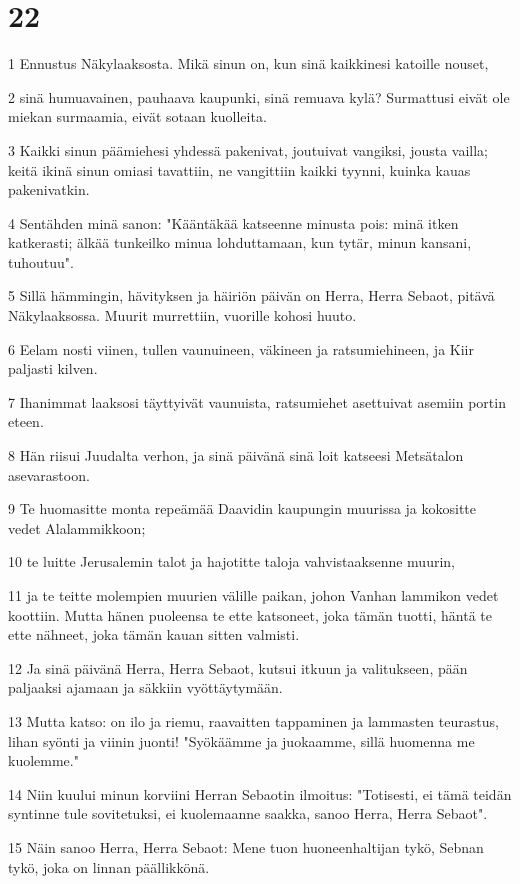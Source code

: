 \chapter{22}

\par 1 Ennustus Näkylaaksosta. Mikä sinun on, kun sinä kaikkinesi katoille nouset,
\par 2 sinä humuavainen, pauhaava kaupunki, sinä remuava kylä? Surmattusi eivät ole miekan surmaamia, eivät sotaan kuolleita.
\par 3 Kaikki sinun päämiehesi yhdessä pakenivat, joutuivat vangiksi, jousta vailla; keitä ikinä sinun omiasi tavattiin, ne vangittiin kaikki tyynni, kuinka kauas pakenivatkin.
\par 4 Sentähden minä sanon: "Kääntäkää katseenne minusta pois: minä itken katkerasti; älkää tunkeilko minua lohduttamaan, kun tytär, minun kansani, tuhoutuu".
\par 5 Sillä hämmingin, hävityksen ja häiriön päivän on Herra, Herra Sebaot, pitävä Näkylaaksossa. Muurit murrettiin, vuorille kohosi huuto.
\par 6 Eelam nosti viinen, tullen vaunuineen, väkineen ja ratsumiehineen, ja Kiir paljasti kilven.
\par 7 Ihanimmat laaksosi täyttyivät vaunuista, ratsumiehet asettuivat asemiin portin eteen.
\par 8 Hän riisui Juudalta verhon, ja sinä päivänä sinä loit katseesi Metsätalon asevarastoon.
\par 9 Te huomasitte monta repeämää Daavidin kaupungin muurissa ja kokositte vedet Alalammikkoon;
\par 10 te luitte Jerusalemin talot ja hajotitte taloja vahvistaaksenne muurin,
\par 11 ja te teitte molempien muurien välille paikan, johon Vanhan lammikon vedet koottiin. Mutta hänen puoleensa te ette katsoneet, joka tämän tuotti, häntä te ette nähneet, joka tämän kauan sitten valmisti.
\par 12 Ja sinä päivänä Herra, Herra Sebaot, kutsui itkuun ja valitukseen, pään paljaaksi ajamaan ja säkkiin vyöttäytymään.
\par 13 Mutta katso: on ilo ja riemu, raavaitten tappaminen ja lammasten teurastus, lihan syönti ja viinin juonti! "Syökäämme ja juokaamme, sillä huomenna me kuolemme."
\par 14 Niin kuului minun korviini Herran Sebaotin ilmoitus: "Totisesti, ei tämä teidän syntinne tule sovitetuksi, ei kuolemaanne saakka, sanoo Herra, Herra Sebaot".
\par 15 Näin sanoo Herra, Herra Sebaot: Mene tuon huoneenhaltijan tykö, Sebnan tykö, joka on linnan päällikkönä.
